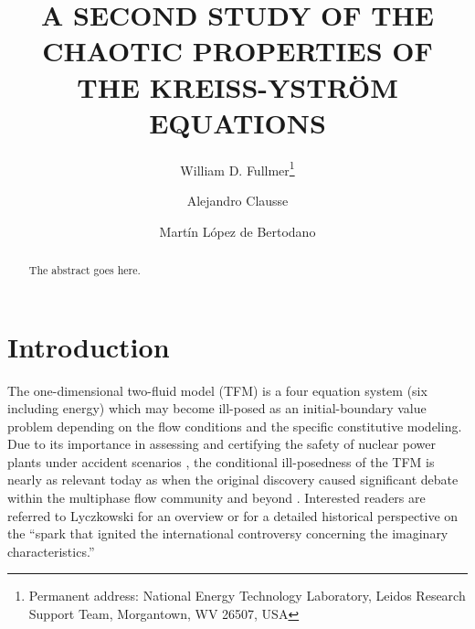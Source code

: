 \documentclass{ws-ijbc}
\begin{document}
\catchline{}{}{}{}{} %


\title{A SECOND STUDY OF THE CHAOTIC PROPERTIES OF THE KREISS-YSTR{\"O}M EQUATIONS}

\author{William D. Fullmer\footnote{Permanent address: National Energy Technology Laboratory, Leidos Research Support Team, Morgantown, WV 26507, USA}}
\address{Leidos, Morgantown, WV 26507, USA\\ 
w.d.fullmer@gmail.com}

\author{Alejandro Clausse}
\address{CNEA-CONICET and University of Central Buenos Aires, 7000 Tandil, Argentina\\ }


\author{Mart{\'i}n L{\'o}pez de Bertodano}
\address{School of Nuclear Engineering, Purdue University, West Lafayette, IN 47907, USA\\ 
}%

\maketitle

\begin{history}
\end{history}

\begin{abstract}
The abstract goes here. 
\end{abstract}


\section{Introduction}
\label{sec.intro}
The one-dimensional two-fluid model (TFM) is a four equation system (six including energy) which may become ill-posed as an initial-boundary value problem depending on the flow conditions and the specific constitutive modeling. Due to its importance in assessing and certifying the safety of nuclear power plants under accident scenarios \cite{trace, relap}, the conditional ill-posedness of the TFM is nearly as relevant today \cite{ahn17, relap7} as when the original discovery caused significant debate within the multiphase flow community and beyond \cite{gidaspow74}. Interested readers are referred to Lyczkowski \cite{lyczkowski10} for an overview or \cite{lyczkowski} for a detailed historical perspective on the ``spark that ignited the international controversy concerning the imaginary characteristics.''
\end{document}
